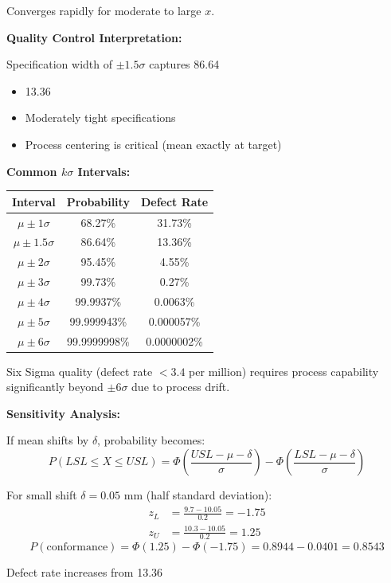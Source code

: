 \documentclass[12pt]{article}
\begin{document}
\begin{explanation}
Converges rapidly for moderate to large $x$.

\textbf{Quality Control Interpretation:}

Specification width of $\pm 1.5\sigma$ captures 86.64%
\begin{itemize}
    \item 13.36%
    \item Moderately tight specifications
    \item Process centering is critical (mean exactly at target)
\end{itemize}

\textbf{Common $k\sigma$ Intervals:}

\begin{center}
\begin{tabular}{c|c|c}
Interval & Probability & Defect Rate \\
\hline
$\mu \pm 1\sigma$ & 68.27\% & 31.73\% \\
$\mu \pm 1.5\sigma$ & 86.64\% & 13.36\% \\
$\mu \pm 2\sigma$ & 95.45\% & 4.55\% \\
$\mu \pm 3\sigma$ & 99.73\% & 0.27\% \\
$\mu \pm 4\sigma$ & 99.9937\% & 0.0063\% \\
$\mu \pm 5\sigma$ & 99.999943\% & 0.000057\% \\
$\mu \pm 6\sigma$ & 99.9999998\% & 0.0000002\%
\end{tabular}
\end{center}

Six Sigma quality (defect rate $< 3.4$ per million) requires process capability significantly beyond $\pm 6\sigma$ due to process drift.

\textbf{Sensitivity Analysis:}

If mean shifts by $\delta$, probability becomes:
\[
P(LSL \leq X \leq USL) = \Phi\left(\frac{USL - \mu - \delta}{\sigma}\right) - \Phi\left(\frac{LSL - \mu - \delta}{\sigma}\right)
\]

For small shift $\delta = 0.05$ mm (half standard deviation):
\begin{align*}
z_L &= \frac{9.7 - 10.05}{0.2} = -1.75 \\
z_U &= \frac{10.3 - 10.05}{0.2} = 1.25
\end{align*}
\[
P(\text{conformance}) = \Phi(1.25) - \Phi(-1.75) = 0.8944 - 0.0401 = 0.8543
\]

Defect rate increases from 13.36%


\end{explanation}
\end{document}
